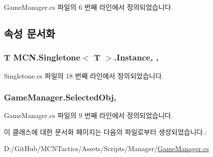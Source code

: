 Game\+Manager.\+cs 파일의 6 번째 라인에서 정의되었습니다.



\subsection{속성 문서화}
\subsubsection[{\texorpdfstring{Instance}{Instance}}]{\setlength{\rightskip}{0pt plus 5cm}T {\bf M\+C\+N.\+Singletone}$<$ T $>$.Instance\hspace{0.3cm}{\ttfamily [static]}, {\ttfamily [get]}, {\ttfamily [inherited]}}\hypertarget{class_m_c_n_1_1_singletone_a46dbbebd93e96a9592a9803c51f35602}{}\label{class_m_c_n_1_1_singletone_a46dbbebd93e96a9592a9803c51f35602}


Singletone.\+cs 파일의 18 번째 라인에서 정의되었습니다.

\subsubsection[{\texorpdfstring{Selected\+Obj}{SelectedObj}}]{ Game\+Manager.\+Selected\+Obj\hspace{0.3cm}{\ttfamily [get]}, {\ttfamily [set]}}\hypertarget{class_game_manager_a708d9fb61ea9f34e4c3a55d34c31acf2}{}\label{class_game_manager_a708d9fb61ea9f34e4c3a55d34c31acf2}


Game\+Manager.\+cs 파일의 9 번째 라인에서 정의되었습니다.



이 클래스에 대한 문서화 페이지는 다음의 파일로부터 생성되었습니다.\+:\begin{DoxyCompactItemize}
\item 
D\+:/\+Git\+Hub/\+M\+C\+N\+Tactics/\+Assets/\+Scripts/\+Manager/\hyperlink{_game_manager_8cs}{Game\+Manager.\+cs}\end{DoxyCompactItemize}
